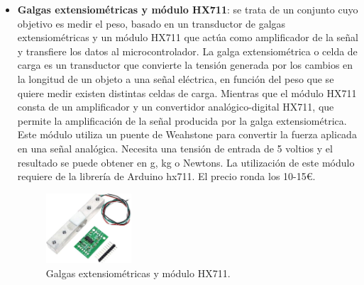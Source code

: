 \begin{itemize}
    
    \item \textbf{Galgas extensiométricas y módulo HX711}\cite{GyHX711}: se trata de un conjunto cuyo objetivo es medir el peso, basado en un transductor de galgas extensiométricas y un módulo HX711 que actúa como amplificador de la señal y transfiere los datos al microcontrolador. La galga extensiométrica o celda de carga es un transductor que convierte la tensión generada por los cambios en la longitud de un objeto a una señal eléctrica, en función del peso que se quiere medir existen distintas celdas de carga. Mientras que el módulo HX711 consta de un amplificador y un convertidor analógico-digital HX711, que permite la amplificación de la señal producida por la galga extensiométrica. Este módulo utiliza un puente de Weahstone para convertir la fuerza aplicada en una señal analógica. Necesita una tensión de entrada de 5 voltios y el resultado se puede obtener en g, kg o Newtons. La utilización de este módulo requiere de la librería de Arduino hx711. El precio ronda los 10-15€.
\begin{figure}[h!]
    \centering
    \includegraphics[width=0.3\textwidth]{img/GyHX711.jpg}
    \caption{Galgas extensiométricas y módulo HX711\cite{imgGyHX711}.}
    \label{fig:HX711} %
\end{figure}


\end{itemize}
